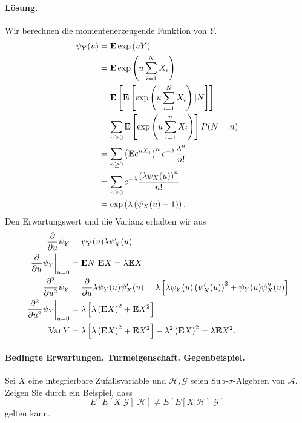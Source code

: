 \paragraph*{Lösung.} Wir berechnen die momentenerzeugende Funktion von $Y$.
\begin{align*}
    \psi_Y(u) &= \mathbf{E} \exp \left( uY \right) \\
    &= \mathbf{E} \exp \left( u\sum_{i=1}^{N} X_i \right) \\
    &= \mathbf{E} \left[\mathbf{E} \left[ \exp\left( u\sum_{i=1}^{N} X_i \right) | N \right] \right] \\ 
    &= \sum_{n \geq 0} \mathbf{E}\left[ \exp\left( u\sum_{i=1}^{n} X_i \right) \right] P(N=n) \\
    &= \sum_{n\geq 0} \left( \mathbf{E} e^{u X_1} \right)^n e^{-\lambda} \frac{\lambda^n}{n!} \\
    &= \sum_{n\geq 0} e^{-\lambda} \frac{\left( \lambda \psi_X(u) \right)^n}{n!} \\
    &= \exp \left( \lambda \left( \psi_X(u) -1 \right) \right).
\end{align*}
Den Erwartungswert und die Varianz erhalten wir aus
\begin{align*}
    \frac{\partial}{\partial u} \psi_Y &= 
    \psi_Y(u) \lambda \psi_X'(u) \\
    \left. \frac{\partial}{\partial u} \psi_Y \right|_{u=0} &= 
    \mathbf{E} N \ \mathbf{E} X = \lambda \mathbf{E} X \\
    \frac{\partial^2}{\partial u^2} \psi_Y &= 
    \frac{\partial}{\partial u} \lambda \psi_Y(u) \psi_X'(u) =
    \lambda \left[ \lambda \psi_Y(u) \left( \psi_X'(u) \right)^2 + \psi_Y(u)\psi_X''(u) \right]   \\
    \left. \frac{\partial^2}{\partial u^2} \psi_Y \right|_{u=0} &= 
    \lambda \left[ \lambda \left( \mathbf{E} X \right)^2 + \mathbf{E} X^2 \right] \\
    \operatorname{Var} Y &= \lambda \left[ \lambda \left( \mathbf{E} X \right)^2 + \mathbf{E} X^2 \right]
    - \lambda^2 \left( \mathbf{E} X \right)^2 = \lambda \mathbf{E} X^2.
\end{align*}






\paragraph{Bedingte Erwartungen. Turmeigenschaft. Gegenbeispiel. } Sei $X$ eine integrierbare Zufallsvariable
und $\mathcal H, \mathcal G$ seien Sub-$\sigma$-Algebren von $\mathcal A$. 
Zeigen Sie durch ein Beispiel, dass 
\begin{equation*}
	E\left[ E\left[ X | \mathcal G \right] | \mathcal H \right] \neq
	E\left[ E\left[ X | \mathcal H \right] | \mathcal G \right]
\end{equation*}
gelten kann. 

